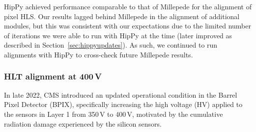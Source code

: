 HipPy achieved performance comparable to that of Millepede for the alignment of pixel HLS. Our results lagged behind Millepede in the alignment of additional modules, but this was consistent with our expectations due to the limited number of iterations we were able to run with HipPy at the time (later improved as described in Section~\ref{sec:hippyupdates}). As such, we continued to run alignments with HipPy to cross-check future Millepede results. 







\subsubsection{HLT alignment at 400\,V}



In late 2022, CMS introduced an updated operational condition in the Barrel Pixel Detector (BPIX), specifically increasing the high voltage (HV) applied to the sensors in Layer 1 from 350\,V to 400\,V, motivated by the cumulative radiation damage experienced by the silicon sensors. 

